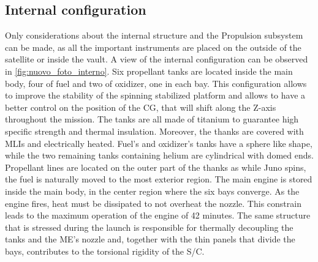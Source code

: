 \subsection{Internal configuration}
\label{subsec:internal_config}


Only considerations about the internal structure and the Propulsion subsystem can be made, as all the important instruments are placed on the outside of the satellite or inside the vault. A view of the internal configuration can be observed in \autoref{fig:nuovo_foto_interno}. Six propellant tanks are located inside the main body, four of fuel and two of oxidizer, one in each bay. This configuration allows to improve the stability of the spinning stabilized platform and allows to have a better control on the position of the CG, that will shift along the Z-axis throughout the mission. The tanks are all made of titanium to guarantee high specific strength and thermal insulation.\cite{LL_early_cruise} Moreover, the thanks are covered with MLIs and electrically heated. Fuel's and oxidizer's tanks have a sphere like shape, while the two remaining tanks containing helium are cylindrical with domed ends. Propellant lines are located on the outer part of the thanks as while Juno spins, the fuel is naturally moved to the most exterior region. The main engine is stored inside the main body, in the center region where the six bays converge.\cite{Leros}\cite{Juno_launch} As the engine fires, heat must be dissipated to not overheat the nozzle. This constrain leads to the maximum operation of the engine of 42 minutes.\cite{Leros} The same structure that is stressed during the launch is responsible for thermally decoupling the tanks and the ME's nozzle and, together with the thin panels that divide the bays, contributes to the torsional rigidity of the S/C.